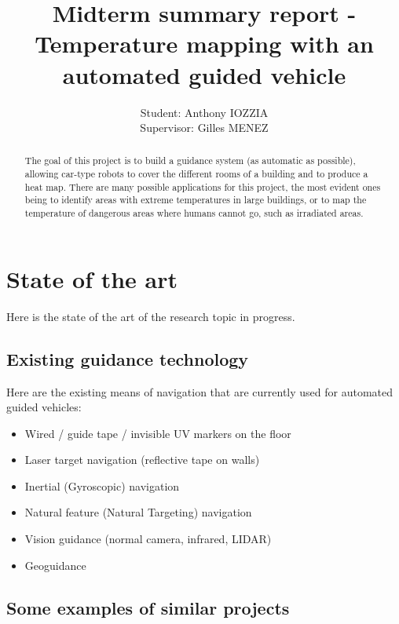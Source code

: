 \documentclass{article}
\title{Midterm summary report - Temperature mapping with an automated guided vehicle}
\author{Student: Anthony IOZZIA\\Supervisor: Gilles MENEZ}
\begin{document}
\maketitle

\thispagestyle{fancy}

\begin{abstract}
The goal of this project is to build a guidance system (as automatic as possible), allowing car-type robots to cover the different rooms of a building and to produce a heat map. There are many possible applications for this project, the most evident ones being to identify areas with extreme temperatures in large buildings, or to map the temperature of dangerous areas where humans cannot go, such as irradiated areas.
\end{abstract}

\section{State of the art}

Here is the state of the art of the research topic in progress.

\subsection{Existing guidance technology}

Here are the existing means of navigation that are currently used for automated guided vehicles:
\begin{itemize}
    \item Wired / guide tape / invisible UV markers on the floor
    \item Laser target navigation (reflective tape on walls)
    \item Inertial (Gyroscopic) navigation
    \item Natural feature (Natural Targeting) navigation
    \item Vision guidance (normal camera, infrared, LIDAR)
    \item Geoguidance
\end{itemize}

\subsection{Some examples of similar projects}
\end{document}
